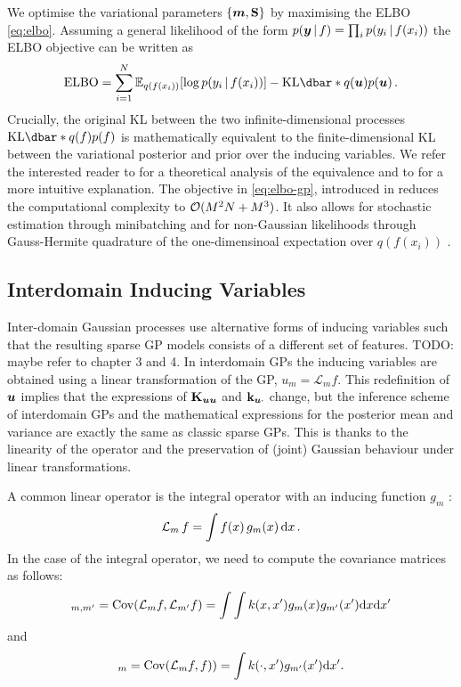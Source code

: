 We optimise the variational parameters $\{\bm{m}, \mathbf{{S}}\}$ by maximising the ELBO \cref{eq:elbo}. Assuming a general likelihood of the form $p(\bm{y} \,|\, f) = \prod_i p(y_i \,|\, f(x_i))$ the ELBO objective can be written as
\begin{equation}
  \label{eq:elbo-gp} 
  \textrm{ELBO} = \sum_{i=1}^N \Exp{q(f(x_i))}{\log p(y_i \given f(x_i))} - \KL{q(\vu)}{p(\vu)} \,. 
\end{equation}
Crucially, the original KL between the two infinite-dimensional processes $\KL{q(f)}{p(f)}$ is mathematically equivalent to the finite-dimensional KL between the variational posterior and prior over the inducing variables. We refer the interested reader to \citet{matthews16} for a theoretical analysis of the equivalence and to \citet[Section 4.1]{Leibfried2020Tutorial} for a more intuitive explanation. The objective in \cref{eq:elbo-gp}, introduced in \citet{hensman2013,hensman2015scalable} reduces the computational complexity to $\mathcal{O}(M^2 N + M^3)$. It also allows for stochastic estimation through minibatching \citep{hensman2013} and for non-Gaussian likelihoods through Gauss-Hermite quadrature of the one-dimensinoal expectation over $q(f(x_i))$ \citep{hensman2015scalable}.

\subsection{Interdomain Inducing Variables}

Inter-domain Gaussian processes use alternative forms of inducing variables such that the resulting sparse GP models consists of a different set of features. TODO: maybe refer to chapter 3 and 4. In interdomain GPs the inducing variables are obtained using a linear transformation of the GP, $u_m = \mathcal{L}_m f$. This redefinition of $\bm{u}$ implies that the expressions of $\mathbf{{K}}_{\bm{u} \bm{u}}$ and $\mathbf{k}_{\bm{u} \cdot}$ change, but the inference scheme of interdomain GPs and the mathematical expressions for the posterior mean and variance are exactly the same as classic sparse GPs. This is thanks to the linearity of the operator and the preservation of (joint) Gaussian behaviour under linear transformations.

A common linear operator is the integral operator with an inducing function $g_m$ \citep{lazaro2009inter}:
\begin{equation*}
    \mathcal{L}_m\,f = \int f(x)\,g_m(x)\,\mathrm{d}{x}\,.
\end{equation*}
In the case of the integral operator, we need to compute the covariance matrices as follows:
\begin{equation}
 [\Kuu]_{m,m'}  = \Cov(\mathcal{L}_m f, \mathcal{L}_{m'} f) = \int \int k(x, x') g_{m}(x) g_{m'}(x') \calcd{x} \calcd{x'}
\end{equation}
and 
\begin{equation}
 [\kux]_{m}  = \Cov(\mathcal{L}_m f, f)) = \int k(\cdot, x') g_{m'}(x') \calcd{x'}.
\end{equation}

